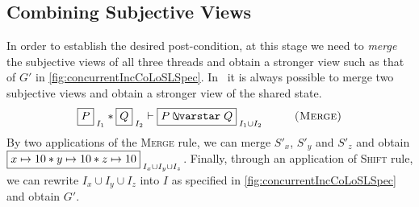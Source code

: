 \subsection{Combining Subjective Views}\label{subsec:merge}
In order to establish the desired post-condition, at this stage we need to \emph{merge} the subjective views of all three threads and obtain a stronger view such as that of $G'$ in \fig\ref{fig:concurrentIncCoLoSLSpec}. In \colosl\ it is always possible to merge two subjective views and obtain a stronger view of the shared state. 
%
\[
	\shared{P}{I_1} * \shared{Q}{I_2} \vdash \shared{P \sepish Q}{I_1 \cup I_2} \hspace*{1cm} \textsc{(Merge)}
\]
%
By two applications of the \textsc{Merge} rule, we can merge $S'_x$, $S'_y$ and $S'_z$ and obtain $\shared{\cell{x}{10} * \cell{y}{10} * \cell{z}{10}}{I_x \cup I_y \cup I_z}$. Finally, through an application of \textsc{Shift} rule, we can rewrite $I_x \cup I_y \cup I_z$ into $I$ as specified in \fig\ref{fig:concurrentIncCoLoSLSpec} and obtain $G'$.
